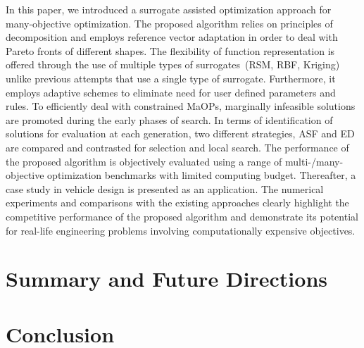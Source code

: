 In this paper, we introduced a surrogate assisted optimization approach for many-objective optimization. The proposed algorithm relies on principles of decomposition and employs reference vector adaptation in order to deal with Pareto fronts of different shapes. The flexibility of function representation is offered through the use of multiple types of surrogates~(RSM, RBF, Kriging) unlike previous attempts that use a single type of surrogate. Furthermore, it employs adaptive schemes to eliminate need for user defined parameters and rules. To efficiently deal with constrained MaOPs, marginally infeasible solutions are promoted during the early phases of search. In terms of identification of solutions for evaluation at each generation, two different strategies, ASF and ED are compared and contrasted for selection and local search. The performance of the proposed algorithm is objectively evaluated using a range of multi-/many-objective optimization benchmarks with limited computing budget. Thereafter, a case study in {\color{blue}vehicle design} is presented as an application. The numerical experiments and comparisons with the existing approaches clearly highlight the competitive performance of the proposed algorithm and demonstrate its potential for real-life engineering problems involving computationally expensive objectives.  

\section{Summary and Future Directions}
\label{sec:sum}


\section{Conclusion}
\label{sec:conc}


\small
